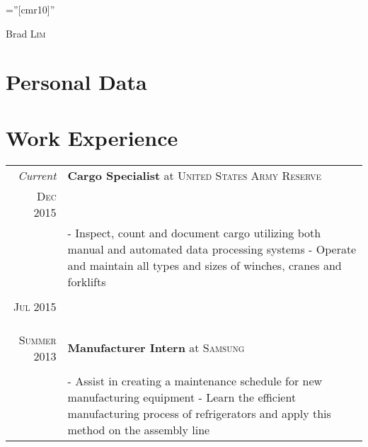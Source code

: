 \documentclass[a4paper,11pt]{article}
\begin{document}
\pagestyle{empty} %

\font\fb=''[cmr10]'' %

\par{\centering
		{\Huge Brad \textsc{Lim}
	}\bigskip\par}

\section{Personal Data}



\section{Work Experience}
\begin{tabular}{r|p{11cm}}
 \emph{Current} & \textbf{Cargo Specialist} at \textsc{United States Army Reserve} \\\textsc{Dec 2015}& \fontsize{10}{12}\selectfont{Arden Hills, MN}\\&\footnotesize{- Inspect, count and document cargo utilizing both manual and automated data processing systems \newline - Operate and maintain all types and sizes of winches, cranes and forklifts
  }\\\multicolumn{2}{c}{} \\
   \textsc{Jul 2015} & \textbf{} \\\textsc{}& \fontsize{10}{12}\selectfont {} \\&\footnotesize{}\\\multicolumn{2}{c}{} \\
   \textsc{Summer 2013} & \textbf{Manufacturer Intern} at \textsc{Samsung}\\\textsc{} & \fontsize{10}{12}\selectfont{Gwangju, South Korea} \\&\footnotesize{- Assist in creating a maintenance schedule for new manufacturing equipment \newline- Learn the efficient manufacturing process of refrigerators and apply this method on the assembly line}
   \end{tabular}

\end{document}
